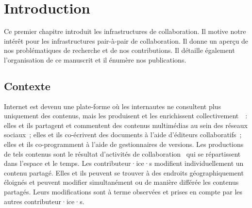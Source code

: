 
\chapter{Introduction}

\minitoc{}
\bigskip

Ce premier chapitre introduit les infrastructures de collaboration. Il motive notre intérêt pour les infrastructures pair-à-pair de collaboration.
Il donne un aperçu de nos problématiques de recherche et de nos contributions.
Il détaille également l'organisation de ce manuscrit et il énumère nos publications.

\clearpage
\section{Contexte}


%
%



Internet est devenu une plate-forme où les internautes ne consultent plus uniquement des contenus, mais les produisent et les enrichissent collectivement~\autocite{mogan2010_web2groupware}~: elles et ils partagent et commentent des contenus multimédias au sein des réseaux sociaux~; elles et ils co-écrivent des documents à l'aide d'éditeurs collaboratifs~; elles et ils co-programment à l'aide de gestionnaires de versions.
Les productions de tels contenus sont le résultat d'activités de collaboration~\autocite{ellis1991_groupware} qui se répartissent dans l'espace et le temps.
Les contributeur·ice·s modifient individuellement un contenu partagé.
Elles et ils peuvent se trouver à des endroits géographiquement éloignés et peuvent modifier simultanément ou de manière différée les contenus partagés.
Leurs modifications sont à terme observées et prises en compte par les autres contributeur·ice·s.

